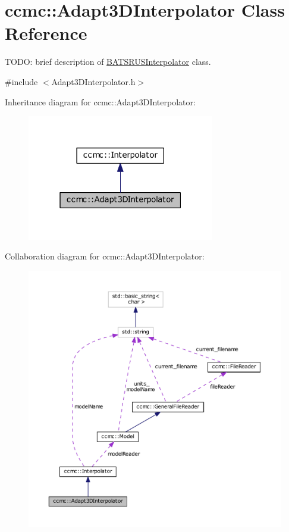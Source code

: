 \hypertarget{classccmc_1_1_adapt3_d_interpolator}{\section{ccmc\-:\-:Adapt3\-D\-Interpolator Class Reference}
\label{classccmc_1_1_adapt3_d_interpolator}
}


T\-O\-D\-O\-: brief description of \hyperlink{classccmc_1_1_b_a_t_s_r_u_s_interpolator}{B\-A\-T\-S\-R\-U\-S\-Interpolator} class.  




{\ttfamily \#include $<$Adapt3\-D\-Interpolator.\-h$>$}



Inheritance diagram for ccmc\-:\-:Adapt3\-D\-Interpolator\-:\nopagebreak
\begin{figure}[H]
\begin{center}
\leavevmode
\includegraphics[width=232pt]{classccmc_1_1_adapt3_d_interpolator__inherit__graph}
\end{center}
\end{figure}


Collaboration diagram for ccmc\-:\-:Adapt3\-D\-Interpolator\-:\nopagebreak
\begin{figure}[H]
\begin{center}
\leavevmode
\includegraphics[width=350pt]{classccmc_1_1_adapt3_d_interpolator__coll__graph}
\end{center}
\end{figure}
